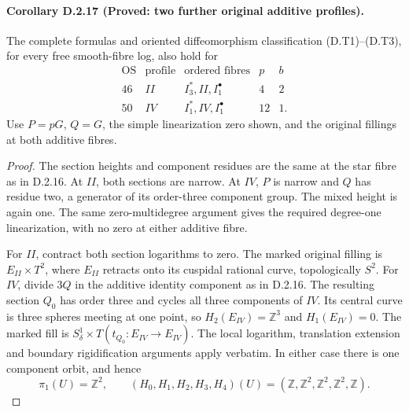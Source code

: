 \paragraph{Corollary D.2.17 (Proved: two further original additive profiles).}
The complete formulas and oriented diffeomorphism classification
(D.T1)--(D.T3), for every free smooth-fibre log, also hold for
\[
\begin{array}{c|c|l|r|r}
 \mathrm{OS}&\mathrm{profile}&\text{ordered fibres}&p&b\\\hline
 46&II&I_3^*,II,I_1^\bullet&4&2\\
 50&IV&I_1^*,IV,I_1^\bullet&12&1.
\end{array}
\]
Use $P=pG$, $Q=G$, the simple linearization zero shown,
and the original fillings at both additive fibres.
\begin{proof}
The section heights and component residues are the same at
the star fibre as in D.2.16. At $II$, both sections are
narrow. At $IV$, $P$ is narrow and $Q$ has residue two,
a generator of its order-three component group.
The mixed height is again one. The same zero-multidegree
argument gives the required degree-one linearization, with
no zero at either additive fibre.

For $II$, contract both section logarithms to zero. The
marked original filling is $E_{II}\times T^2$, where
$E_{II}$ retracts onto its cuspidal rational curve,
topologically $S^2$. For $IV$, divide $3Q$ in the additive
identity component as in D.2.16. The resulting section
$Q_0$ has order three and cycles all three components of
$IV$. Its central curve is three spheres meeting at one
point, so $H_2(E_{IV})=\mathbb Z^3$ and $H_1(E_{IV})=0$.
The marked fill is
$S^1_\delta\times T(t_{Q_0}:E_{IV}\to E_{IV})$.
The local logarithm, translation extension and boundary
rigidification arguments apply verbatim. In either case
there is one component orbit, and hence
\[
 \pi_1(U)=\mathbb Z^2,\qquad
 (H_0,H_1,H_2,H_3,H_4)(U)
       =(\mathbb Z,\mathbb Z^2,\mathbb Z^2,\mathbb Z^2,\mathbb Z).
\]


\end{proof}
